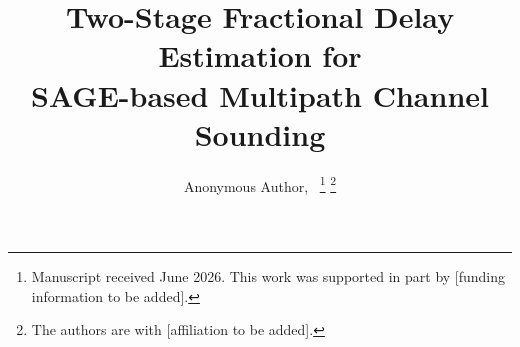 \documentclass[journal]{IEEEtran}
\begin{document}
\title{Two-Stage Fractional Delay Estimation for\\SAGE-based Multipath Channel Sounding}

\author{Anonymous Author,~
\thanks{Manuscript received June 2026. This work was supported in part by [funding information to be added].}
\thanks{The authors are with [affiliation to be added].}}

\maketitle

\end{document}
